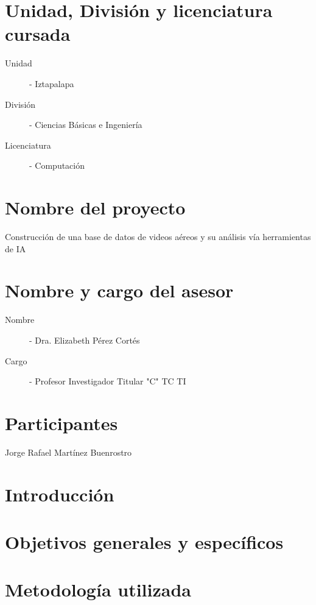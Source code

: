 \documentclass[letterpaper,11pt,twoside]{report}
\begin{document}
	\section{Unidad, Divisi\'on y licenciatura cursada}
	\begin{description}
		\item[Unidad] - Iztapalapa
		\item[Divisi\'on] - Ciencias B\'asicas e Ingenier\'ia
		\item[Licenciatura] - Computaci\'on   
	\end{description}


	\section{Nombre del proyecto}
	\noindent Construcci\'on de una base de datos de videos a\'ereos y su an\'alisis v\'ia herramientas de IA

	\section{Nombre y cargo del asesor}
	\begin{description}
		\item[Nombre] - Dra. Elizabeth P\'erez Cort\'es
		\item[Cargo] - Profesor Investigador Titular "C" TC TI
	\end{description}

	\section{Participantes}
	\noindent Jorge Rafael Mart\'inez Buenrostro

	\section{Introducci\'on}


	\section{Objetivos generales y espec\'ificos}
	

	\section{Metodolog\'ia utilizada}
\end{document}
